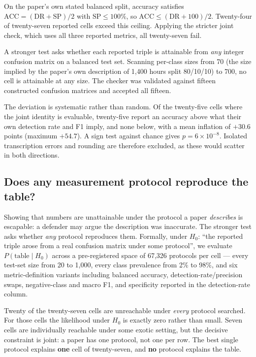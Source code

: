 \documentclass[11pt]{article}
\begin{document}
On the paper's own stated balanced split, accuracy satisfies
$\mathrm{ACC} = (\mathrm{DR} + \mathrm{SP})/2$ with $\mathrm{SP} \le 100\%$, so
$\mathrm{ACC} \le (\mathrm{DR}+100)/2$. Twenty-four of twenty-seven reported
cells exceed this ceiling. Applying the stricter joint check, which uses all
three reported metrics, all twenty-seven fail.

A stronger test asks whether each reported triple is attainable from \emph{any}
integer confusion matrix on a balanced test set. Scanning per-class sizes from
70 (the size implied by the paper's own description of 1{,}400 hours split
80/10/10) to 700, no cell is attainable at any size. The checker was validated
against fifteen constructed confusion matrices and accepted all fifteen.

The deviation is systematic rather than random. Of the twenty-five cells where
the joint identity is evaluable, twenty-five report an accuracy above what their
own detection rate and F1 imply, and none below, with a mean inflation of
$+30.6$ points (maximum $+54.7$). A sign test against chance gives
$p = 6\times10^{-8}$. Isolated transcription errors and rounding are therefore
excluded, as these would scatter in both directions.

\subsection{Does any measurement protocol reproduce the table?}

Showing that numbers are unattainable under the protocol a paper \emph{describes}
is escapable: a defender may argue the description was inaccurate. The stronger
test asks whether \emph{any} protocol reproduces them. Formally, under
$H_0$: ``the reported triple arose from a real confusion matrix under some
protocol'', we evaluate $P(\text{table} \mid H_0)$ across a pre-registered space
of 67{,}326 protocols per cell --- every test-set size from 20 to 1{,}000, every
class prevalence from 2\% to 98\%, and six metric-definition variants including
balanced accuracy, detection-rate/precision swaps, negative-class and macro F1,
and specificity reported in the detection-rate column.

Twenty of the twenty-seven cells are unreachable under \emph{every} protocol
searched. For those cells the likelihood under $H_0$ is exactly zero rather than
small. Seven cells are individually reachable under some exotic setting, but the
decisive constraint is joint: a paper has one protocol, not one per row. The best
single protocol explains \textbf{one} cell of twenty-seven, and \textbf{no}
protocol explains the table.
\end{document}
